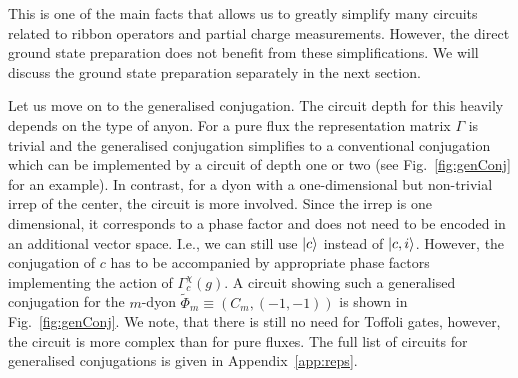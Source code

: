 \documentclass[a4paper,twocolumn,11pt]{quantumarticle}
\begin{document}
This is one of the main facts that allows us to greatly simplify many circuits related to ribbon operators and partial charge measurements. However, the direct ground state preparation does not benefit from these simplifications. We will discuss the ground state preparation separately in the next section.



Let us move on to the generalised conjugation. The circuit depth for this heavily depends on the type of anyon. For a pure flux the representation matrix $\Gamma$ is trivial and the generalised conjugation simplifies to a conventional conjugation which can be implemented by a circuit of depth one or two (see Fig.~\ref{fig:genConj} for an example). In contrast, for a dyon with a one-dimensional but non-trivial irrep of the center, the circuit is more involved. Since the irrep is one dimensional, it corresponds to a phase factor and does not need to be encoded in an additional vector space. I.e., we can still use $\ket{c}$ instead of $\ket{c,i}$. However, the conjugation of $c$ has to be accompanied by appropriate phase factors implementing the action of $\Gamma^\chi_c(g)$. A circuit showing such a generalised conjugation for the $m$-dyon $\tilde{\Phi}_m \equiv (C_m, (-1, -1))$ is shown in Fig.~\ref{fig:genConj}. We note, that there is still no need for Toffoli gates, however, the circuit is more complex than for pure fluxes. The full list of circuits for generalised conjugations is given in Appendix~\ref{app:reps}.
\end{document}
